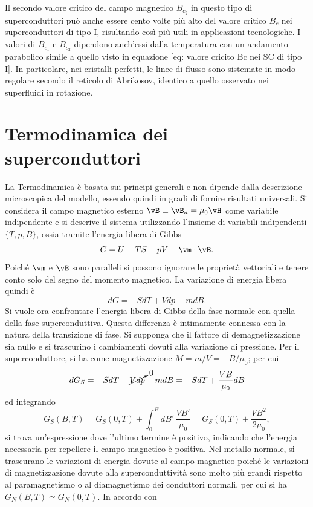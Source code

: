 Il secondo valore critico del campo magnetico $B_{c_2}$ in questo tipo di superconduttori può anche essere cento volte più alto del valore critico $B_c$ nei superconduttori di tipo I, risultando così più utili in applicazioni tecnologiche. I valori di $B_{c_1}$ e $B_{c_2}$ dipendono anch'essi dalla temperatura con un andamento parabolico simile a quello visto in equazione \eqref{eq: valore cricito Bc nei SC di tipo I}. In particolare, nei cristalli perfetti, le linee di flusso sono sistemate in modo regolare secondo il reticolo di Abrikosov, identico a quello osservato nei superfluidi in rotazione. 

\section{Termodinamica dei superconduttori}
La Termodinamica è basata sui principi generali e non dipende dalla descrizione microscopica del modello, essendo quindi in gradi di fornire risultati universali. Si considera il campo magnetico esterno $\vB \equiv \vB_a = \mu_0\vH$ come variabile indipendente e si descrive il sistema utilizzando l'insieme di variabili indipendenti $\{T,p,B\}$, ossia tramite l'energia libera di Gibbs 
\begin{equation}
    G = U - TS +pV - \vm \cdot \vB.
\end{equation}
Poiché $\vm$ e $\vB$ sono paralleli si possono ignorare le proprietà vettoriali e tenere conto solo del segno del momento magnetico. La variazione di energia libera quindi è 
\begin{equation}
    dG = -SdT + Vdp - mdB.
\end{equation}
Si vuole ora confrontare l'energia libera di Gibbs della fase normale con quella della fase superconduttiva.  Questa differenza è intimamente connessa con la natura della transizione di fase. Si supponga che il fattore di demagnetizzazione sia nullo e si trascurino i cambiamenti dovuti alla variazione di pressione. Per il superconduttore, si ha come magnetizzazione $M = m/V = -B/\mu_0$; per cui 
\begin{equation}
    dG_S  = -SdT + \cancelto{0}{Vdp} - mdB = -SdT + \frac{VB}{\mu_0}dB
\end{equation}
ed integrando
\begin{equation}
    G_S(B,T) = G_S(0,T) + \int_0^BdB'\,\frac{VB'}{\mu_0} = G_S(0,T) + \frac{VB^2}{2\mu_0},
\end{equation}
si trova un'espressione dove l'ultimo termine è positivo, indicando che l'energia necessaria per repellere il campo magnetico è positiva. Nel metallo normale, si trascurano le variazioni di energia dovute al campo magnetico poiché le variazioni di magnetizzazione dovute alla superconduttività sono molto più grandi rispetto al paramagnetismo o al diamagnetismo dei conduttori normali, per cui si ha $G_N(B,T) \simeq G_N(0,T)$. In accordo con
